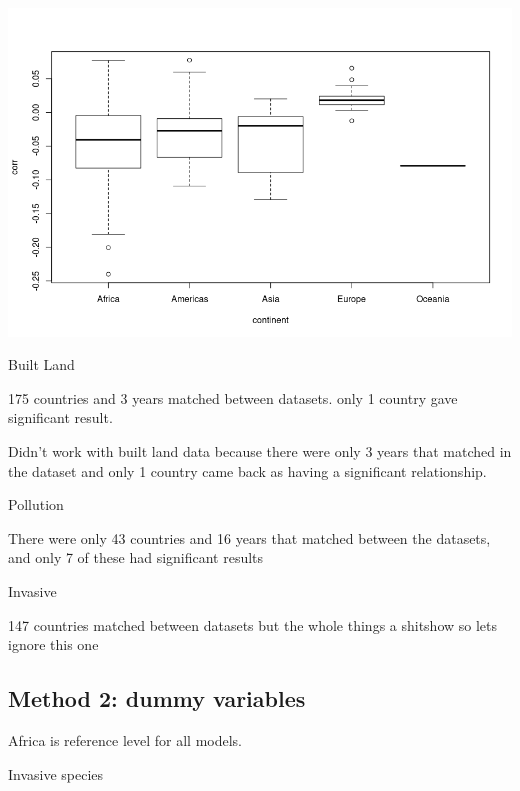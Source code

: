 \documentclass[11pt, a4paper, titlepage]{article}
\begin{document}
	\includegraphics[scale=0.75]{images/SensitivityScoresClimate.png}
	
	Built Land \newline
	
	175 countries and 3 years matched between datasets. only 1 country gave significant result.
	
	Didn't work with built land data because there were only 3 years that matched in the dataset and only 1 country came back as having a significant relationship. \newline
	
	Pollution \newline
	
	There were only 43 countries and 16 years that matched between the datasets, and only 7 of these had significant results \newline
	
	Invasive \newline
	
	147 countries matched between datasets but the whole things a shitshow so lets ignore this one
	
	
	
	
	 
	\subsection*{Method 2: dummy variables}
	 
	 Africa is reference level for all models. \newline

Invasive species \newline
\end{document}
